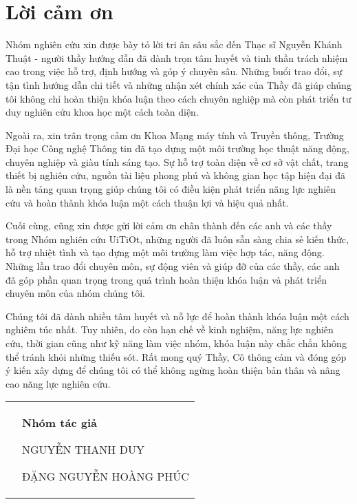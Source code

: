 \chapter*{Lời cảm ơn}
Nhóm nghiên cứu xin được bày tỏ lời tri ân sâu sắc đến Thạc sĩ Nguyễn Khánh Thuật - người thầy hướng dẫn đã dành trọn tâm huyết và tinh thần trách nhiệm cao trong việc hỗ trợ, định hướng và góp ý chuyên sâu. Những buổi trao đổi, sự tận tình hướng dẫn chi tiết và những nhận xét chính xác của Thầy đã giúp chúng tôi không chỉ hoàn thiện khóa luận theo cách chuyên nghiệp mà còn phát triển tư duy nghiên cứu khoa học một cách toàn diện.

Ngoài ra, xin trân trọng cảm ơn Khoa Mạng máy tính và Truyền thông, Trường Đại học Công nghệ Thông tin đã tạo dựng một môi trường học thuật năng động, chuyên nghiệp và giàu tính sáng tạo. Sự hỗ trợ toàn diện về cơ sở vật chất, trang thiết bị nghiên cứu, nguồn tài liệu phong phú và không gian học tập hiện đại đã là nền tảng quan trọng giúp chúng tôi có điều kiện phát triển năng lực nghiên cứu và hoàn thành khóa luận một cách thuận lợi và hiệu quả nhất.

Cuối cùng, cũng xin được gửi lời cảm ơn chân thành đến các anh và các thầy trong Nhóm nghiên cứu UiTiOt, những người đã luôn sẵn sàng chia sẻ kiến thức, hỗ trợ nhiệt tình và tạo dựng một môi trường làm việc hợp tác, năng động. Những lần trao đổi chuyên môn, sự động viên và giúp đỡ của các thầy, các anh đã góp phần quan trọng trong quá trình hoàn thiện khóa luận và phát triển chuyên môn của nhóm chúng tôi.

Chúng tôi đã dành nhiều tâm huyết và nỗ lực để hoàn thành khóa luận một cách nghiêm túc nhất. Tuy nhiên, do còn hạn chế về kinh nghiệm, năng lực nghiên cứu, thời gian cũng như kỹ năng làm việc nhóm, khóa luận này chắc chắn không thể tránh khỏi những thiếu sót. Rất mong quý Thầy, Cô thông cảm và đóng góp ý kiến xây dựng để chúng tôi có thể không ngừng hoàn thiện bản thân và nâng cao năng lực nghiên cứu.
    {
    \begin{table}[ht]
        \centering
        \begin{tabular}{>{\centering}m{}>{\centering\arraybackslash}m{}}
            & \textbf{Nhóm tác giả}

            NGUYỄN THANH DUY

            ĐẶNG NGUYỄN HOÀNG PHÚC
        \end{tabular}
    \end{table}
}